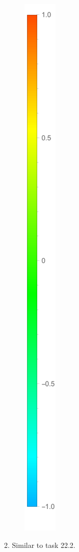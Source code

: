 \documentclass[12pt,a4paper,pdflatex]{disser}
\begin{document}
\begin{figure}[!h]
\begin{center}
\includegraphics[scale=0.75]{potentscale.pdf}
\end{center}
\end{figure}

2. Similar to task 22.2.
\end{document}
